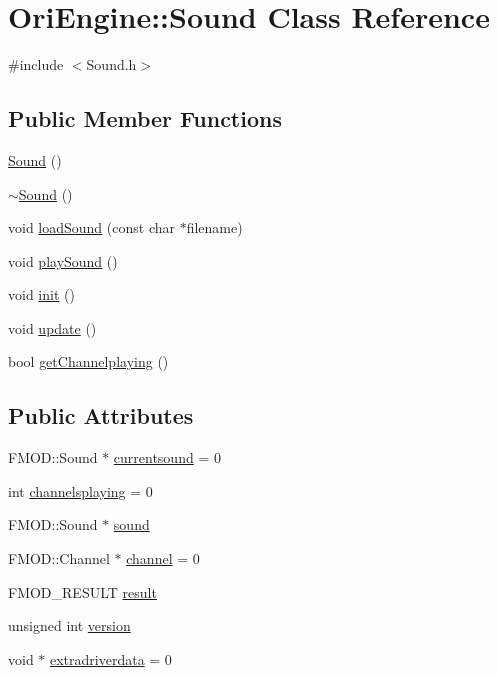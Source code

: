 \hypertarget{class_ori_engine_1_1_sound}{}\section{Ori\+Engine\+:\+:Sound Class Reference}
\label{class_ori_engine_1_1_sound}


{\ttfamily \#include $<$Sound.\+h$>$}

\subsection*{Public Member Functions}
\begin{DoxyCompactItemize}
\item 
\hyperlink{class_ori_engine_1_1_sound_a539c205cdf06fe2c621fd77c37bcfac9}{Sound} ()
\item 
\hyperlink{class_ori_engine_1_1_sound_a0907389078bf740be2a5763366ad3376}{$\sim$\+Sound} ()
\item 
void \hyperlink{class_ori_engine_1_1_sound_adbf1efef44994480b3c3e9becd034a7f}{load\+Sound} (const char $\ast$filename)
\item 
void \hyperlink{class_ori_engine_1_1_sound_a3ce5b74dc968ccf49b06fe1bbb22b68f}{play\+Sound} ()
\item 
void \hyperlink{class_ori_engine_1_1_sound_a2ca114ac4088d01a0fdda97fa3dc9b2b}{init} ()
\item 
void \hyperlink{class_ori_engine_1_1_sound_a1363950fc24a88df0c358f453843b80c}{update} ()
\item 
bool \hyperlink{class_ori_engine_1_1_sound_adf67b3e0608dc8e2a3e39ad92a086f8d}{get\+Channelplaying} ()
\end{DoxyCompactItemize}
\subsection*{Public Attributes}
\begin{DoxyCompactItemize}
\item 
F\+M\+O\+D\+::\+Sound $\ast$ \hyperlink{class_ori_engine_1_1_sound_a37c74fe1bf0dab55211c78a432337627}{currentsound} = 0
\item 
int \hyperlink{class_ori_engine_1_1_sound_a2836bbe85bb423313d4e5c6a8c591a44}{channelsplaying} = 0
\item 
F\+M\+O\+D\+::\+Sound $\ast$ \hyperlink{class_ori_engine_1_1_sound_a2ddb42221696bf2d74cdf3b5b560fb3e}{sound}
\item 
F\+M\+O\+D\+::\+Channel $\ast$ \hyperlink{class_ori_engine_1_1_sound_a963e5638fef3106b3715130cb1e75f82}{channel} = 0
\item 
F\+M\+O\+D\+\_\+\+R\+E\+S\+U\+LT \hyperlink{class_ori_engine_1_1_sound_ab86a49dbdac39a19e6c6aae872652d3e}{result}
\item 
unsigned int \hyperlink{class_ori_engine_1_1_sound_ac80240cf5908a2a77af263bd359b0349}{version}
\item 
void $\ast$ \hyperlink{class_ori_engine_1_1_sound_a171548ea8d26a1075cd65505688186d2}{extradriverdata} = 0
\end{DoxyCompactItemize}


